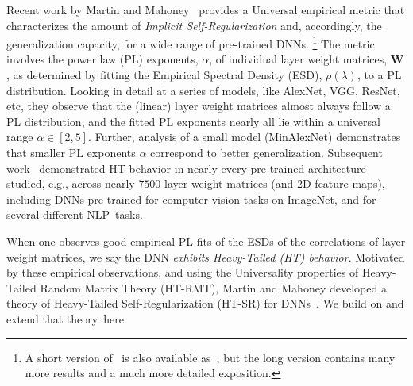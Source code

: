 Recent work by Martin and Mahoney~\cite{MM18_TR,MM19_HTSR_ICML} provides a Universal empirical metric that characterizes the amount of \emph{Implicit Self-Regularization} and, accordingly, the generalization capacity, for a wide range of pre-trained DNNs.%
\footnote{A short version of~\cite{MM18_TR} is also available as~\cite{MM19_HTSR_ICML}, but the long version contains many more results and a much more detailed exposition.  }
The metric involves the power law (PL) exponents, $\alpha$, of individual layer weight matrices, $\mathbf{W}$, as determined by fitting the Empirical Spectral Density (ESD), $\rho(\lambda)$, to a PL distribution.
Looking in detail at a series of models, like AlexNet, VGG, ResNet, etc, they observe that the (linear) layer weight matrices almost always follow a PL distribution, and the fitted PL exponents nearly all lie within a universal range $\alpha\in[2,5]$. 
Further, analysis of a small model (MinAlexNet) demonstrates that smaller PL exponents $\alpha$ correspond to better generalization.
Subsequent work~\cite{MM18_unpub_work} demonstrated HT behavior in nearly every pre-trained architecture studied, e.g., across nearly $7500$ layer weight matrices (and 2D feature maps), including DNNs pre-trained for computer vision tasks on ImageNet, and for several different NLP~tasks.

When one observes good empirical PL fits of the ESDs of the correlations of layer weight matrices, we say the DNN \emph{exhibits Heavy-Tailed (HT) behavior}.
Motivated by these empirical observations, and using the Universality properties of Heavy-Tailed Random Matrix Theory (HT-RMT), Martin and Mahoney developed a theory of Heavy-Tailed Self-Regularization (HT-SR) for DNNs~\cite{MM17_TR,MM18_TR,MM19_HTSR_ICML}.
We build on and extend that theory~here.

